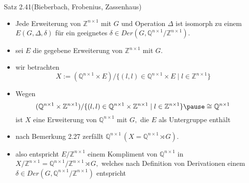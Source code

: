 \documentclass{beamer}
\begin{document}
\begin{frame}
\begin{block}{Satz 2.41(Bieberbach, Frobenius, Zassenhaus)}
\begin{itemize}
\item Jede Erweiterung von $\mathbb{Z}^{n\times 1}$ mit $G$ und Operation $\Delta$ ist isomorph zu einem $E(G,\Delta,\delta)$ für ein geeignetes $\delta \in Der(G,\mathbb{Q}^{n\times 1}/\mathbb{Z}^{n\times 1}).$
\end{itemize}
\end{block}
\end{frame}
\begin{frame}
\begin{itemize}
\item sei $E$ die gegebene Erweiterung von $\mathbb{Z}^{n\times 1}$ mit $G.$ \pause
\item wir betrachten
\[
X:=(\mathbb{Q}^{n\times 1} \times E)/\{(l,l)\in \mathbb{Q}^{n\times 1}\times E\mid l\in \mathbb{Z}^{n\times 1}\} 
\]\pause 
\item Wegen 
\[
(\mathbb{Q}^{n\times 1}\times \mathbb{Z}^{n\times 1})/\{(l,l)\in \mathbb{Q}^{n\times 1}\times \mathbb{Z}^{n\times 1}\mid l\in \mathbb{Z}^{n\times 1}\} \pause \cong \mathbb{Q}^{n\times 1}
\] \pause 
ist $X$ eine Erweiterung von $\mathbb{Q}^{n\times 1}$ mit $G,$ die $E$ als Untergruppe enthält \pause 
\item nach Bemerkung 2.27 zerfällt $\mathbb{Q}^{n\times 1}\,(X=\mathbb{Q}^{n\times 1}\rtimes G).$ \pause 
\item also entspricht $E/\mathbb{Z}^{n\times 1}$ einem Kompliment von $\mathbb{Q}^{n\times 1}$ in $X/ \mathbb{Z}^{n\times 1}=\mathbb{Q}^{n\times 1}/\mathbb{Z}^{n\times 1}\rtimes G,$ welches nach Definition von Derivationen einem $\delta \in Der(G,\mathbb{Q}^{n\times 1}/\mathbb{Z}^{n\times 1})$ entspricht  
\end{itemize}
\end{frame}
\end{document}
